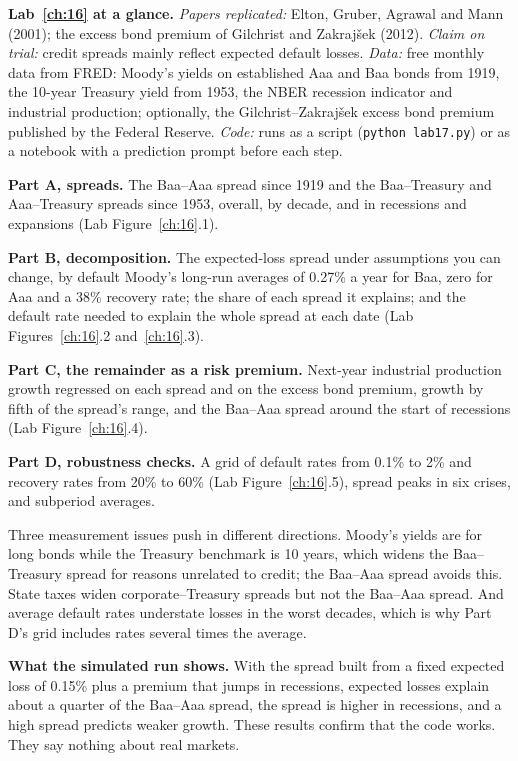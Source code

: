 \begin{callout}
\textbf{Lab~\ref{ch:16} at a glance.} \emph{Papers replicated:} Elton, Gruber, Agrawal and Mann (2001); the excess bond premium of Gilchrist and Zakraj\v{s}ek (2012). \emph{Claim on trial:} credit spreads mainly reflect expected default losses. \emph{Data:} free monthly data from FRED: Moody's yields on established Aaa and Baa bonds from 1919, the 10-year Treasury yield from 1953, the NBER recession indicator and industrial production; optionally, the Gilchrist--Zakraj\v{s}ek excess bond premium published by the Federal Reserve. \emph{Code:} runs as a script (\texttt{python lab17.py}) or as a notebook with a prediction prompt before each step.
\end{callout}

\textbf{Part A, spreads.} The Baa--Aaa spread since 1919 and the Baa--Treasury and Aaa--Treasury spreads since 1953, overall, by decade, and in recessions and expansions (Lab Figure~\ref{ch:16}.1).

\textbf{Part B, decomposition.} The expected-loss spread under assumptions you can change, by default Moody's long-run averages of 0.27\% a year for Baa, zero for Aaa and a 38\% recovery rate; the share of each spread it explains; and the default rate needed to explain the whole spread at each date (Lab Figures~\ref{ch:16}.2 and~\ref{ch:16}.3).

\textbf{Part C, the remainder as a risk premium.} Next-year industrial production growth regressed on each spread and on the excess bond premium, growth by fifth of the spread's range, and the Baa--Aaa spread around the start of recessions (Lab Figure~\ref{ch:16}.4).

\textbf{Part D, robustness checks.} A grid of default rates from 0.1\% to 2\% and recovery rates from 20\% to 60\% (Lab Figure~\ref{ch:16}.5), spread peaks in six crises, and subperiod averages.

Three measurement issues push in different directions. Moody's yields are for long bonds while the Treasury benchmark is 10 years, which widens the Baa--Treasury spread for reasons unrelated to credit; the Baa--Aaa spread avoids this. State taxes widen corporate--Treasury spreads but not the Baa--Aaa spread. And average default rates understate losses in the worst decades, which is why Part D's grid includes rates several times the average.

\textbf{What the simulated run shows.} With the spread built from a fixed expected loss of 0.15\% plus a premium that jumps in recessions, expected losses explain about a quarter of the Baa--Aaa spread, the spread is higher in recessions, and a high spread predicts weaker growth. These results confirm that the code works. They say nothing about real markets.

